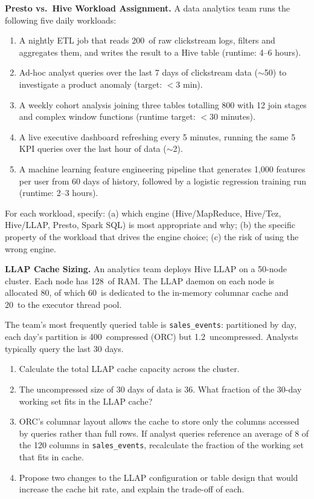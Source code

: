 \ap \textbf{Presto vs.\ Hive Workload Assignment.}
A data analytics team runs the following five daily workloads:
\begin{enumerate}[label=(\roman*)]
  \item A nightly ETL job that reads 200\TB\ of raw clickstream logs,
        filters and aggregates them, and writes the result to a Hive
        table (runtime: 4--6 hours).
  \item Ad-hoc analyst queries over the last 7 days of clickstream data
        ($\sim$50\GB) to investigate a product anomaly (target: $<$3 min).
  \item A weekly cohort analysis joining three tables totalling 800\GB
        with 12 join stages and complex window functions (runtime target:
        $<$30 minutes).
  \item A live executive dashboard refreshing every 5 minutes, running
        the same 5 KPI queries over the last hour of data ($\sim$2\GB).
  \item A machine learning feature engineering pipeline that generates
        1{,}000 features per user from 60 days of history, followed by
        a logistic regression training run (runtime: 2--3 hours).
\end{enumerate}

For each workload, specify: (a) which engine (Hive/MapReduce, Hive/Tez,
Hive/LLAP, Presto, Spark SQL) is most appropriate and why; (b) the
specific property of the workload that drives the engine choice;
(c) the risk of using the wrong engine.

\ap \textbf{LLAP Cache Sizing.}
An analytics team deploys Hive LLAP on a 50-node cluster. Each node
has 128\GB\ of RAM. The LLAP daemon on each node is allocated 80\GB,
of which 60\GB\ is dedicated to the in-memory columnar cache and 20\GB\
to the executor thread pool.

The team's most frequently queried table is \texttt{sales\_events}:
partitioned by day, each day's partition is 400\GB\ compressed (ORC)
but 1.2\TB\ uncompressed. Analysts typically query the last 30 days.

\begin{enumerate}[label=(\alph*)]
  \item Calculate the total LLAP cache capacity across the cluster.
  \item The uncompressed size of 30 days of data is 36\TB. What
        fraction of the 30-day working set fits in the LLAP cache?
  \item ORC's columnar layout allows the cache to store only the columns
        accessed by queries rather than full rows. If analyst queries
        reference an average of 8 of the 120 columns in
        \texttt{sales\_events}, recalculate the fraction of the
        working set that fits in cache.
  \item Propose two changes to the LLAP configuration or table design
        that would increase the cache hit rate, and explain the trade-off
        of each.
\end{enumerate}

